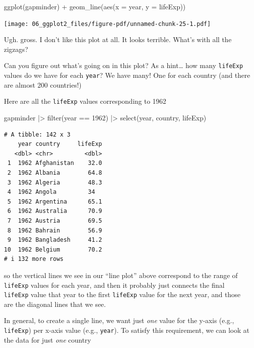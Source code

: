 \documentclass[
  letterpaper,
  DIV=11,
  numbers=noendperiod]{scrreprt}
\newenvironment{Shaded}{\begin{snugshade}}{\end{snugshade}}
\newcommand{\AttributeTok}[1]{\textcolor[rgb]{0.40,0.45,0.13}{#1}}
\newcommand{\DecValTok}[1]{\textcolor[rgb]{0.68,0.00,0.00}{#1}}
\newcommand{\FunctionTok}[1]{\textcolor[rgb]{0.28,0.35,0.67}{#1}}
\newcommand{\NormalTok}[1]{\textcolor[rgb]{0.00,0.23,0.31}{#1}}
\newcommand{\SpecialCharTok}[1]{\textcolor[rgb]{0.37,0.37,0.37}{#1}}
\begin{document}
\begin{Shaded}
\begin{Highlighting}[]
\FunctionTok{ggplot}\NormalTok{(gapminder) }\SpecialCharTok{+} 
  \FunctionTok{geom\_line}\NormalTok{(}\FunctionTok{aes}\NormalTok{(}\AttributeTok{x =}\NormalTok{ year, }
                \AttributeTok{y =}\NormalTok{ lifeExp))}
\end{Highlighting}
\end{Shaded}

\texttt{[image: 06\_ggplot2\_files/figure-pdf/unnamed-chunk-25-1.pdf]}

Ugh. gross. I don't like this plot at all. It looks terrible. What's
with all the zigzags?

Can you figure out what's going on in this plot? As a hint\ldots{} how
many \texttt{lifeExp} values do we have for each \texttt{year}? We have
many! One for each country (and there are almost 200 countries!)

Here are all the \texttt{lifeExp} values corresponding to 1962

\begin{Shaded}
\begin{Highlighting}[]
\NormalTok{gapminder }\SpecialCharTok{|\textgreater{}}
  \FunctionTok{filter}\NormalTok{(year }\SpecialCharTok{==} \DecValTok{1962}\NormalTok{) }\SpecialCharTok{|\textgreater{}} 
  \FunctionTok{select}\NormalTok{(year, country, lifeExp)}
\end{Highlighting}
\end{Shaded}

\begin{verbatim}
# A tibble: 142 x 3
    year country     lifeExp
   <dbl> <chr>         <dbl>
 1  1962 Afghanistan    32.0
 2  1962 Albania        64.8
 3  1962 Algeria        48.3
 4  1962 Angola         34  
 5  1962 Argentina      65.1
 6  1962 Australia      70.9
 7  1962 Austria        69.5
 8  1962 Bahrain        56.9
 9  1962 Bangladesh     41.2
10  1962 Belgium        70.2
# i 132 more rows
\end{verbatim}

so the vertical lines we see in our ``line plot'' above correspond to
the range of \texttt{lifeExp} values for each year, and then it probably
just connects the final \texttt{lifeExp} value that year to the first
\texttt{lifeExp} value for the next year, and those are the diagonal
lines that we see.

In general, to create a single line, we want just \emph{one} value for
the y-axis (e.g., \texttt{lifeExp}) per x-axis value (e.g.,
\texttt{year}). To satisfy this requirement, we can look at the data for
just \emph{one} country
\end{document}
